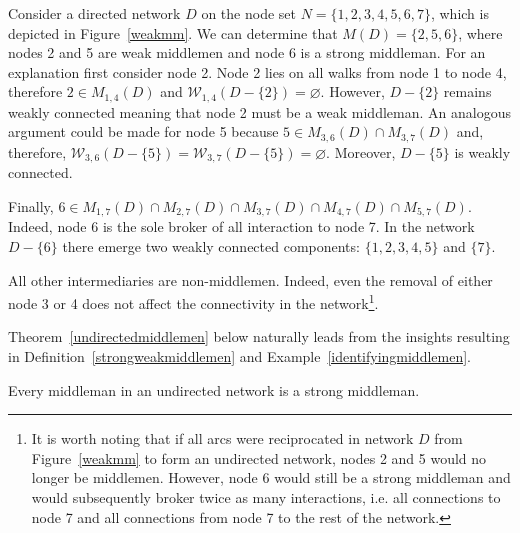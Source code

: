 \begin{example} \label{identifyingmiddlemen}
Consider a directed network $D$ on the node set $N=\{1,2,3,4,5,6,7\}$, which is depicted in Figure~\ref{weakmm}. We can determine that $M(D)=\{2,5,6\}$, where nodes 2 and 5 are weak middlemen and node 6 is a strong middleman. For an explanation first consider node 2. Node 2 lies on all walks from node 1 to node 4, therefore $2 \in M_{1,4}(D)$ and $\mathcal{W}_{1,4}(D - \{2\}) = \varnothing$. However, $D - \{2\}$ remains weakly connected meaning that node 2 must be a weak middleman. An analogous argument could be made for node 5 because $5 \in M_{3,6}(D) \cap M_{3,7}(D)$ and, therefore, $\mathcal{W}_{3,6}(D - \{5\}) = \mathcal{W}_{3,7}(D - \{5\}) = \varnothing$. Moreover, $D - \{5\}$ is weakly connected.

Finally, $6 \in M_{1,7}(D) \cap M_{2,7}(D) \cap M_{3,7}(D) \cap M_{4,7}(D) \cap M_{5,7}(D)$. Indeed, node 6 is the sole broker of all interaction to node 7. In the network $D - \{6\}$ there emerge two weakly connected components: $\{ 1,2,3,4,5 \}$ and $\{ 7 \}$.

All other intermediaries are non-middlemen. Indeed, even the removal of either node 3 or 4 does not affect the connectivity in the network\footnote{It is worth noting that if all arcs were reciprocated in network $D$ from Figure~\ref{weakmm} to form an undirected network, nodes 2 and 5 would no longer be middlemen. However, node 6 would still be a strong middleman and would subsequently broker twice as many interactions, i.e. all connections to node 7 and all connections from node 7 to the rest of the network.}.
\end{example}

Theorem~\ref{undirectedmiddlemen} below naturally leads from the insights resulting in Definition~\ref{strongweakmiddlemen} and Example~\ref{identifyingmiddlemen}.

\begin{theorem} \label{undirectedmiddlemen}
Every middleman in an undirected network is a strong middleman.
\end{theorem}

